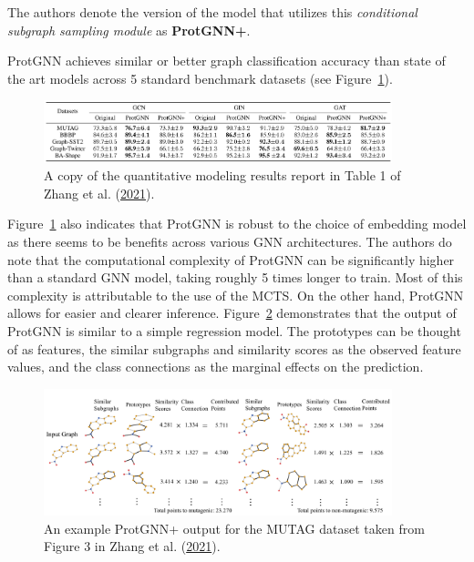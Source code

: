 \documentclass[
  11pt,
  letterpaper,
]{article}
\begin{document}
The authors denote the version of the model that utilizes this
\emph{conditional subgraph sampling module} as \textbf{ProtGNN+}.

\quad ProtGNN achieves similar or better graph classification accuracy
than state of the art models across 5 standard benchmark datasets (see
Figure~\ref{fig-prot-acc-table}).

\begin{figure}

{\centering \includegraphics[width=0.9\textwidth,height=\textheight]{figures/prot_acc_table.png}

}

\caption{\label{fig-prot-acc-table}A copy of the quantitative modeling
results report in Table 1 of Zhang et al.
(\protect\hyperlink{ref-Zhang_Liu_Wang_Lu_Lee_2021}{2021}).}

\end{figure}

Figure~\ref{fig-prot-acc-table} also indicates that ProtGNN is robust to
the choice of embedding model as there seems to be benefits across
various GNN architectures. The authors do note that the computational
complexity of ProtGNN can be significantly higher than a standard GNN
model, taking roughly 5 times longer to train. Most of this complexity
is attributable to the use of the MCTS. On the other hand, ProtGNN
allows for easier and clearer inference. Figure~\ref{fig-prot-diagram}
demonstrates that the output of ProtGNN is similar to a simple
regression model. The prototypes can be thought of as features, the
similar subgraphs and similarity scores as the observed feature values,
and the class connections as the marginal effects on the prediction.

\begin{figure}

{\centering \includegraphics[width=0.9\textwidth,height=\textheight]{figures/prot_inference_ex.png}

}

\caption{\label{fig-prot-diagram}An example ProtGNN+ output for the
MUTAG dataset taken from Figure 3 in Zhang et al.
(\protect\hyperlink{ref-Zhang_Liu_Wang_Lu_Lee_2021}{2021}).}

\end{figure}
\end{document}
